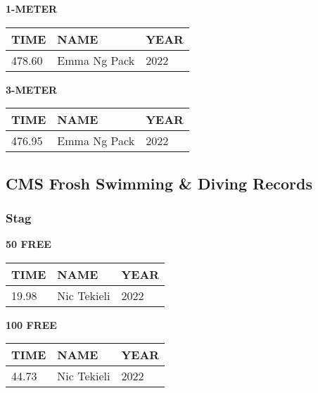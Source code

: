 \begin{table}[H]
\centering
\begin{minipage}[t]{0.6\textwidth}
\centering
\textbf{1-METER}\\[0.1cm]
\begin{tabular}{@{}p{1.8cm}p{2.8cm}p{1.2cm}@{}}
\hline
    \textbf{TIME} & \textbf{NAME} & \textbf{YEAR} \\
\hline
    478.60 & Emma Ng Pack & 2022 \\
\hline
\end{tabular}
\end{minipage}
\end{table}

\begin{table}[H]
\centering
\begin{minipage}[t]{0.6\textwidth}
\centering
\textbf{3-METER}\\[0.1cm]
\begin{tabular}{@{}p{1.8cm}p{2.8cm}p{1.2cm}@{}}
\hline
    \textbf{TIME} & \textbf{NAME} & \textbf{YEAR} \\
\hline
    476.95 & Emma Ng Pack & 2022 \\
\hline
\end{tabular}
\end{minipage}
\end{table}


\newpage

\subsection{CMS Frosh Swimming \& Diving Records}
\subsubsection{Stag}

\begin{table}[H]
\centering
\begin{minipage}[t]{0.48\textwidth}
\centering
\textbf{50 FREE}\\[0.1cm]
\begin{tabular}{@{}p{1.8cm}p{2.8cm}p{1.2cm}@{}}
\hline
    \textbf{TIME} & \textbf{NAME} & \textbf{YEAR} \\
\hline
    19.98 & Nic Tekieli & 2022 \\
\hline
\end{tabular}
\end{minipage}\hfill
\begin{minipage}[t]{0.48\textwidth}
\centering
\textbf{100 FREE}\\[0.1cm]
\begin{tabular}{@{}p{1.8cm}p{2.8cm}p{1.2cm}@{}}
\hline
    \textbf{TIME} & \textbf{NAME} & \textbf{YEAR} \\
\hline
    44.73 & Nic Tekieli & 2022 \\
\hline
\end{tabular}
\end{minipage}
\end{table}

